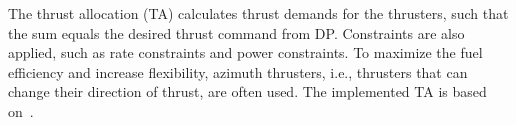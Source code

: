 \documentclass[twocolumn,10pt]{asme2e}
\newcommand{\vect}[1]{\boldsymbol{#1}}
\begin{document}
The thrust allocation (TA) calculates thrust demands for the thrusters, such that the sum equals the desired thrust command from DP.
Constraints are also applied, such as rate constraints and power constraints.
To maximize the fuel efficiency and increase flexibility, azimuth thrusters, i.e., thrusters that can change their direction of thrust, are often used.
The implemented TA is based on~\cite{Ruth2009,Johansen2013,Veksler2014a}.

\end{document}
